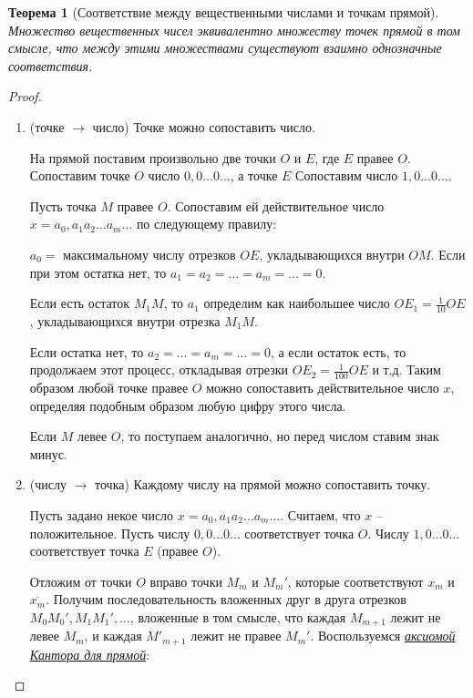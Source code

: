\documentclass[a4paper,oneside]{article}
\newtheorem{theorem}{Теорема}[subsection]
\begin{document}
\begin{theorem}[Соответствие между вещественными числами и точкам прямой]
    Множество вещественных чисел эквивалентно множеству точек прямой в том смысле, что
    между этими множествами существуют взаимно однозначные соответствия.
\end{theorem}
\begin{proof}
    \begin{enumerate}
        \item 
            (точке $\rightarrow$ число) Точке можно сопоставить число.
        
            На прямой поставим произвольно две точки $O$ и $E$, где $E$ правее $O$.
            Сопоставим точке $O$ число $0,0 \dots 0 \dots$, а точке $E$
            Сопоставим число $1,0 \dots 0 \dots$.
            
            Пусть точка $M$ правее $O$. Сопоставим ей действительное число
            $x = a_0,a_1 a_2 \dots a_m \dots$ по следующему правилу:
            
            $a_0 = $ максимальному числу отрезков $OE$, укладывающихся внутри $OM$.
            Если при этом остатка нет, то $a_1 = a_2 = \dots = a_m = \dots = 0$.
            
            Если есть остаток $M_1M$, то $a_1$ определим как наибольшее число
            $OE_1 = \frac{1}{10}OE$, укладывающихся внутри отрезка $M_1M$.
            
            Если остатка нет, то $a_2 = \dots = a_m = \dots = 0$, а если остаток есть,
            то продолжаем этот процесс, откладывая отрезки $OE_2 = \frac{1}{100}OE$ 
            и т.д. Таким образом любой точке правее $O$ можно сопоставить действительное
            число $x$, определяя подобным образом любую цифру этого числа.
            
            Если $M$ левее $O$, то поступаем аналогично, но перед числом ставим знак минус.
    
        \item 
            (числу $\rightarrow$ точка) Каждому числу на прямой можно сопоставить точку.
        
            Пусть задано некое число $x = a_0,a_1 a_2 \dots a_m \dots$. Считаем, что
            $x$ -- положительное. Пусть числу $0,0 \dots 0 \dots$ соответствует точка $O$.
            Числу $1,0 \dots 0 \dots$ соответствует точка $E$ (правее $O$).
            
            Отложим от точки $O$ вправо точки $M_m$ и $M_m'$, которые соответствуют
            $x_m$ и $\overline{x_m}$. Получим последовательность вложенных друг в друга
            отрезков $M_0M_0', M_1M_1', \dots$, вложенные в том смысле, что каждая
            $M_{m+1}$ лежит не левее $M_m$, и каждая $M'_{m+1}$ лежит
            не правее $M_m'$. Воспользуемся \underline{\textit{аксиомой Кантора для прямой}}:
            

\end{enumerate}
\end{proof}
\end{document}
